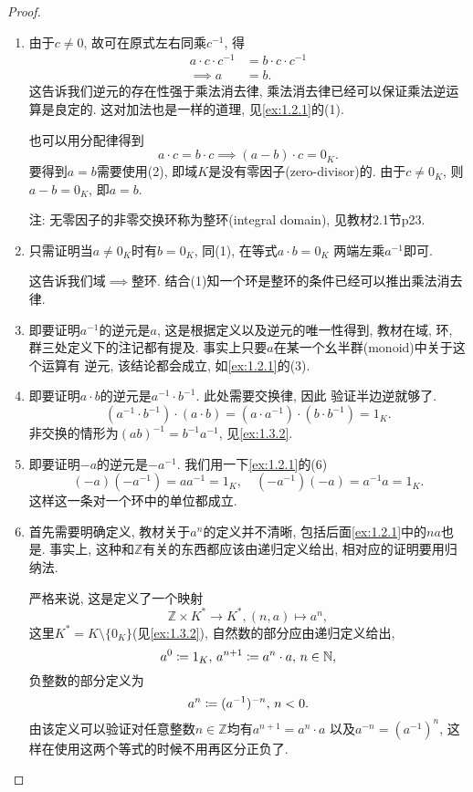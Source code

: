 \begin{proof}
    \begin{enumerate}[(1)]
        \item 由于$c \neq 0$, 故可在原式左右同乘$c^{-1}$, 得 
        \[ 
        \begin{aligned} 
            a \cdot c \cdot c^{-1} &= b \cdot c \cdot c^{-1}\\ 
            \implies a &= b.
        \end{aligned} 
        \]
        这告诉我们逆元的存在性强于乘法消去律, 乘法消去律已经可以保证乘法逆运算是良定的.
        这对加法也是一样的道理, 见\ref{ex:1.2.1}的(1).

        也可以用分配律得到
        \[
            a \cdot c = b \cdot c \implies (a - b) \cdot c = 0_K.
        \]
        要得到$a = b$需要使用(2), 即域$K$是没有零因子(zero-divisor)的. 由于$c \neq 0_K$,
    则$a - b = 0_K$, 即$a = b$.

        注: 无零因子的非零交换环称为整环(integral domain), 见教材2.1节p23.
        \item 只需证明当$a \neq 0_K$时有$b = 0_K$, 同(1), 在等式$a \cdot b = 0_K$
    两端左乘$a^{-1}$即可.
        
        这告诉我们域$\implies$整环. 结合(1)知一个环是整环的条件已经可以推出乘法消去律.
        \item 即要证明$a^{-1}$的逆元是$a$, 这是根据定义以及逆元的唯一性得到, 教材在域, 
    环, 群三处定义下的注记都有提及. 事实上只要$a$在某一个幺半群(monoid)中关于这个运算有
    逆元, 该结论都会成立, 如\ref{ex:1.2.1}的(3).
        \item 即要证明$a \cdot b$的逆元是$a^{-1} \cdot b^{-1}$. 此处需要交换律, 因此
    验证半边逆就够了.
    \[
        (a^{-1} \cdot b^{-1}) \cdot (a \cdot b) = (a \cdot a^{-1}) \cdot (b \cdot b^{-1}) = 1_K.
    \]
    非交换的情形为$(ab)^{-1} = b^{-1}a^{-1}$, 见\ref{ex:1.3.2}.
        \item 即要证明$-a$的逆元是$-a^{-1}$. 我们用一下\ref{ex:1.2.1}的(6)
    \[
        (-a)(-a^{-1}) = aa^{-1} = 1_K, \quad (-a^{-1})(-a) = a^{-1}a = 1_K.
    \]
    这样这一条对一个环中的单位都成立.
        \item 首先需要明确定义, 教材关于$a^n$的定义并不清晰, 包括后面\ref{ex:1.2.1}中的$na$也是.
    事实上, 这种和$\mathbb{Z}$有关的东西都应该由递归定义给出, 相对应的证明要用归纳法.
        
        严格来说, 这是定义了一个映射
    \[
        \mathbb{Z} \times K^* \to K^*, (n, a) \mapsto a^n,
    \]
        这里$K^* = K \setminus \{0_K\}$(见\ref{ex:1.3.2}), 自然数的部分应由递归定义给出, 
    \[
        a^0 \mathrel{\coloneqq} 1_K,\, a^{n + 1} \mathrel{\coloneqq} a^n \cdot a,\, n \in \mathbb{N},
    \]
        负整数的部分定义为
    \[
        a^n \mathrel{\coloneqq} (a^{-1})^{-n},\, n < 0. 
    \]
    由该定义可以验证对任意整数$n \in \mathbb{Z}$均有$a^{n + 1} = a^n \cdot a$
    以及$a^{-n} = (a^{-1})^n$, 这样在使用这两个等式的时候不用再区分正负了.


\end{enumerate}
\end{proof}
